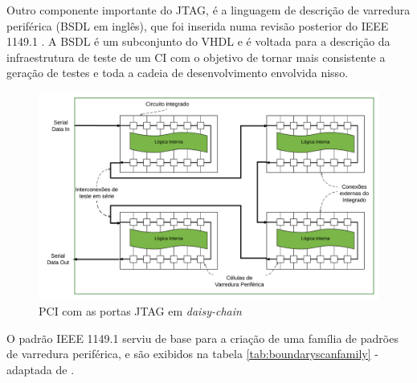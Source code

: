 Outro componente importante do JTAG, é a linguagem de descrição de varredura periférica (BSDL em inglês), que foi inserida numa revisão posterior do IEEE 1149.1 \citep{ieee11491de94}. A BSDL é um subconjunto do VHDL e é voltada para a descrição da infraestrutura de teste de um CI com o objetivo de tornar mais consistente a geração de testes e toda a cadeia de desenvolvimento envolvida nisso.

\begin{figure}
    \centering
        \includegraphics[width=1.0\linewidth]{fig/cadeiabs}
            \caption{PCI com as portas JTAG em \textit{daisy-chain}}
            \label{fig:cadeiabs}
\end{figure}


O padrão IEEE 1149.1 serviu de base para a criação de uma família de padrões de varredura periférica, e são exibidos na tabela \ref{tab:boundaryscanfamily} - adaptada de \citet{jutman2014high}.  

